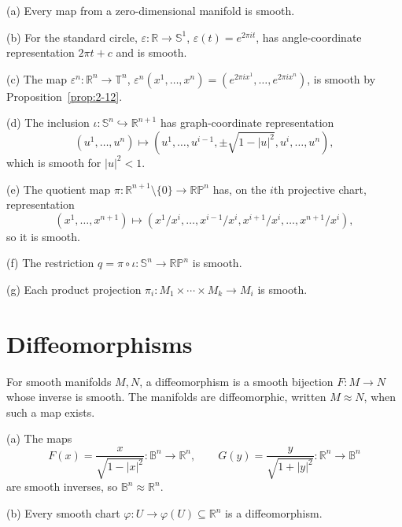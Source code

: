 \begin{example}
\label{ex:2-13}
\leanok
{}
(a) Every map from a zero-dimensional manifold is smooth.

(b) For the standard circle, $\varepsilon:\mathbb R\to\mathbb S^1$, $\varepsilon(t)=e^{2\pi it}$, has angle-coordinate representation $2\pi t+c$ and is smooth.

(c) The map $\varepsilon^n:\mathbb R^n\to\mathbb T^n$, $\varepsilon^n(x^1,\ldots,x^n)=(e^{2\pi ix^1},\ldots,e^{2\pi ix^n})$, is smooth by Proposition~\ref{prop:2-12}.

(d) The inclusion $\iota:\mathbb S^n\hookrightarrow\mathbb R^{n+1}$ has graph-coordinate representation
\[
(u^1,\ldots,u^n)\longmapsto(u^1,\ldots,u^{i-1},\pm\sqrt{1-|u|^2},u^i,\ldots,u^n),
\]
which is smooth for $|u|^2<1$.

(e) The quotient map $\pi:\mathbb R^{n+1}\setminus\{0\}\to\mathbb{RP}^n$ has, on the $i$th projective chart, representation
\[
(x^1,\ldots,x^{n+1})\longmapsto(x^1/x^i,\ldots,x^{i-1}/x^i,x^{i+1}/x^i,\ldots,x^{n+1}/x^i),
\]
so it is smooth.

(f) The restriction $q=\pi\circ\iota:\mathbb S^n\to\mathbb{RP}^n$ is smooth.

(g) Each product projection $\pi_i:M_1\times\cdots\times M_k\to M_i$ is smooth.
\end{example}

\section{Diffeomorphisms}

\begin{definition}
\label{def:2-9-extra-1}
\mathlibok
For smooth manifolds $M,N$, a diffeomorphism is a smooth bijection $F:M\to N$ whose inverse is smooth. The manifolds are diffeomorphic, written $M\approx N$, when such a map exists.
\end{definition}

\begin{example}
\label{ex:2-14}
\leanok
{}
(a) The maps
\[
F(x)=\frac{x}{\sqrt{1-|x|^2}}:\mathbb B^n\to\mathbb R^n,
\qquad G(y)=\frac{y}{\sqrt{1+|y|^2}}:\mathbb R^n\to\mathbb B^n
\tag{2.1}
\]
are smooth inverses, so $\mathbb B^n\approx\mathbb R^n$.

(b) Every smooth chart $\varphi:U\to\varphi(U)\subseteq\mathbb R^n$ is a diffeomorphism.
\end{example}

